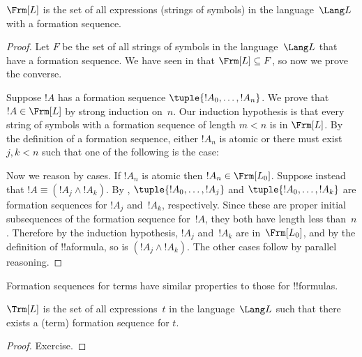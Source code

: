 \documentclass[../../../include/open-logic-section]{subfiles}
\begin{document}
\begin{thm}
$\Frm[L]$ is the set of all expressions (strings of symbols)
in the language~$\Lang L$ with a formation sequence.
\end{thm}

\begin{proof}
Let $F$ be the set of all strings of symbols in the language~$\Lang L$
that have a formation sequence. We have seen in
 that $\Frm[L] \subseteq F$, so now
we prove the converse.

Suppose $!A$ has a formation sequence $\tuple{!A_0,\dotsc,!A_n}$.
We prove that $!A \in \Frm[L]$ by strong induction on~$n$.
Our induction hypothesis is that every string of symbols with a
formation sequence of length $m < n$ is in $\Frm[L]$.
By the definition of a formation sequence, either $!A_n$ is
atomic or there must exist $j,k < n$ such that one of the
following is the case:
\begin{enumerate}
\end{enumerate}
Now we reason by cases. If $!A_n$ is atomic then
$!A_n \in \Frm[L_0]$. Suppose instead that
$!A \equiv (!A_j \land !A_k)$. By 
,
$\tuple{!A_0,\dotsc,!A_j}$ and $\tuple{!A_0,\dotsc,!A_k}$ are
formation sequences for $!A_j$ and~$!A_k$, respectively. Since
these are proper initial subsequences of the formation sequence
for~$!A$, they both have length less than~$n$. Therefore by
the induction hypothesis, $!A_j$ and~$!A_k$ are in~$\Frm[L_0]$,
and by the definition of !!a{formula}, so is
$(!A_j \land !A_k)$. The other cases follow by parallel
reasoning.
\end{proof}

Formation sequences for terms have similar properties to those
for !!{formula}s.

\begin{prop}
$\Trm[L]$ is the set of all expressions~$t$ in the language~$\Lang L$
such that there exists a (term) formation sequence for $t$.
\end{prop}

\begin{proof}
Exercise.
\end{proof}
\end{document}
